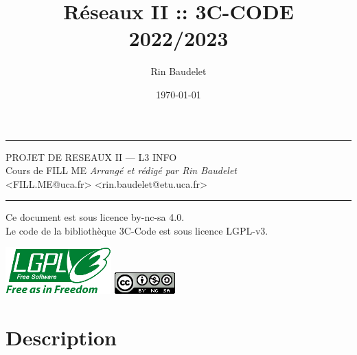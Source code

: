 \documentclass[12pt,a4paper]{article}
\title{Réseaux II :: 3C-CODE\\\small{2022/2023}}
\author{Rin Baudelet}
\date{\today}
\newcommand{\jmpP}[0]{\vspace*{6mm}}
\begin{document}
\maketitle 
\rule{\linewidth}{0.2mm}
\begin{flushleft}
{\large \uppercase{PROJET DE RESEAUX II} — L3 INFO} \\
\jmpP
{
	\centering
	Cours de FILL ME \hfill \textit{Arrangé et rédigé par Rin Baudelet}\\
	<FILL.ME@uca.fr> \hfill <rin.baudelet@etu.uca.fr>
}
\vspace*{-3mm}
\end{flushleft}
\rule{\linewidth}{0.2mm}
\tableofcontents
\vfill
\begin{center}
\begin{tcolorbox}[width=126mm]
\centering
Ce document est sous licence by-nc-sa 4.0. \\
Le code de la bibliothèque 3C-Code est sous licence LGPL-v3.
\end{tcolorbox}
\vspace*{5mm}
\href{https://www.gnu.org/licenses/lgpl-3.0.html}{\includegraphics[scale=0.63]{lgplv3-with-text-154x68.png}}
\hspace*{15mm}
\href{http://creativecommons.org/licenses/by-nc-sa/4.0/}{\includegraphics{88x31.png}}
\end{center}
\thispagestyle{basic}
\pagebreak
%
%
\section{Description}

%
%
\pagebreak
{}
\printnoidxglossary[title=Liste des définitions,toctitle=Liste des définitions]
\listoffigures
{}
\listoftables
\thispagestyle{theannex}
\end{document}
